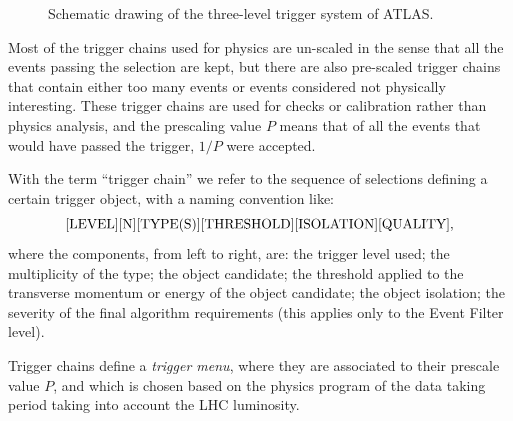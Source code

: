 \begin{figure}[tb]\begin{center}
	\caption{Schematic drawing of the three-level trigger system of ATLAS.\label{fig:trigger}}
\end{center}\end{figure}

Most of the trigger chains used for physics are un-scaled in the
sense that all the events passing the selection are kept, but there
are also pre-scaled trigger chains that contain either too many events
or events considered not physically interesting. These trigger chains
are used for checks or calibration rather than physics analysis, and the
prescaling value $P$ means that of all the events that would have passed 
the trigger, $1/P$ were accepted.

With the term ``trigger chain'' we refer to the sequence of selections
defining a certain trigger object, with a naming convention like:
\begin{equation*}\label{eq:}
{\rm [LEVEL][N][TYPE(S)][THRESHOLD][ISOLATION][QUALITY]},
\end{equation*}
where the components, from left to right, are: the trigger level used; the
multiplicity of the type; the object candidate; the threshold applied to
the transverse momentum or energy of the object candidate; the object isolation;
the severity of the final algorithm requirements (this applies only to the Event
Filter level).

Trigger chains define a {\it trigger menu}, where they are associated to their
prescale value $P$, and which is chosen based on the physics program of the
data taking period taking into account the LHC luminosity. 


